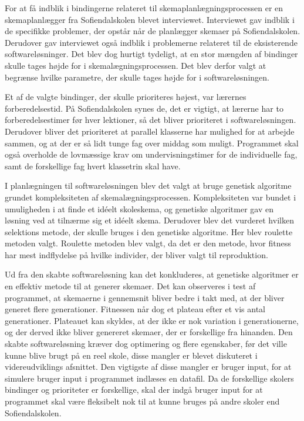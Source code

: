 For at få indblik i bindingerne relateret til skemaplanlægningsprocessen er en skemaplanlægger fra Sofiendalskolen blevet interviewet. Interviewet gav indblik i de specifikke problemer, der opstår når de planlægger skemaer på Sofiendalskolen. Derudover gav interviewet også indblik i problemerne relateret til de eksisterende softwareløsninger. Det blev dog hurtigt tydeligt, at en stor mængden af bindinger skulle tages højde for i skemalægningsprocessen. Det blev derfor valgt at begrænse hvilke parametre, der skulle tages højde for i softwareløsningen. 

Et af de valgte bindinger, der skulle prioriteres højest, var lærernes forberedelsestid. På Sofiendalskolen synes de, det er vigtigt, at lærerne har to forberedelsestimer før hver lektioner, så det bliver prioriteret i softwareløsningen. Derudover bliver det prioriteret at parallel klasserne har mulighed for at arbejde sammen, og at der er så lidt tunge fag over middag som muligt. Programmet skal også overholde de lovmæssige krav om undervisningstimer for de individuelle fag, samt de forskellige fag hvert klassetrin skal have. 

I planlægningen til softwareløsningen blev det valgt at bruge genetisk algoritme grundet kompleksiteten af skemalægningsprocessen. Kompleksiteten var bundet i umuligheden i at finde et idéelt skoleskema, og genetiske algoritmer gav en løsning ved at tilnærme sig et idéelt skema. Derudover blev det vurderet hvilken selektions metode, der skulle bruges i den genetiske algoritme. Her blev roulette metoden valgt. Roulette metoden blev valgt, da det er den metode, hvor fitness har mest indflydelse på hvilke individer, der bliver valgt til reproduktion. 

Ud fra den skabte softwareløsning kan det konkluderes, at genetiske algoritmer er en effektiv metode til at generer skemaer. Det kan observeres i test af programmet, at skemaerne i gennemsnit bliver bedre i takt med, at der bliver generet flere generationer. Fitnessen når dog et plateau efter et vis antal generationer. Plateauet kan skyldes, at der ikke er nok variation i generationerne, og der derved ikke bliver genereret skemaer, der er forskellige fra hinanden. Den skabte softwareløsning kræver dog optimering og flere egenskaber, før det ville kunne blive brugt på en reel skole, disse mangler er blevet diskuteret i videreudviklings afsnittet. Den vigtigste af disse mangler er bruger input, for at simulere bruger input i programmet indlæses en datafil. Da de forskellige skolers bindinger og prioriteter er forskellige, skal der indgå bruger input for at programmet skal være fleksibelt nok til at kunne bruges på andre skoler end Sofiendalskolen.
